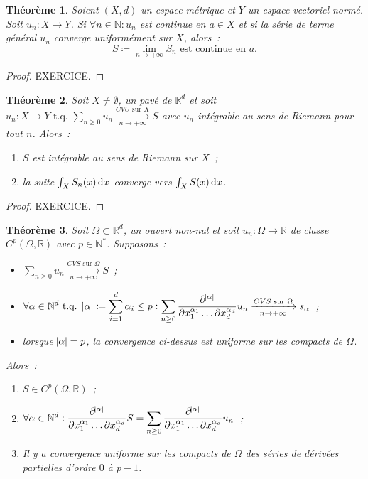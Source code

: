 \documentclass{report}
\newtheorem{thm}{Théorème}[chapter]
\theoremstyle{definition}
\theoremstyle{remark}
\numberwithin{equation}{section}
\newcommand{\R}{\mathbb R}
\newcommand{\N}{\mathbb N}
\newcommand{\tq}{\text{ t.q. }}
\newcommand{\CONV}[5]{\xrightarrow[#2 \to #3]{#4 \text{ #5 } #1}}
\newcommand{\CVS}[3]{\CONV{#1}{#2}{#3}{CVS}{sur}}
\newcommand{\CVU}[3]{\CONV{#1}{#2}{#3}{CVU}{sur}}
\newcommand{\pinfty}{{+\infty}}
\newcommand{\evn}{espace vectoriel normé}
\begin{document}
			\begin{thm}\label{thm:fncvusériecvg} Soient $(X, d)$ un espace métrique et $Y$ un \evn. Soit $u_n : X \to Y$. Si $\forall n \in \N : u_n$ est continue en
			$a \in X$ et si la série de terme général $u_n$ converge uniformément sur $X$, alors~:
			\begin{equation}
				S \coloneqq \lim_{n \to \pinfty}S_n \text{ est continue en } a.
			\end{equation}
			\end{thm}

			\begin{proof} EXERCICE.
			\end{proof}

			\begin{thm} Soit $X \neq \emptyset$, un pavé de $\R^d$ et soit $u_n : X \to Y \tq \sum_{n \geq 0}u_n \CVU Xn\pinfty S$ avec $u_n$ intégrable au
			sens de Riemann pour tout $n$. Alors~:
			\begin{enumerate}
				\item $S$ est intégrable au sens de Riemann sur $X$~;
				\item la suite $\int_XS_n(x)\dif x$ converge vers $\int_XS(x)\dif x$.
			\end{enumerate}
			\end{thm}

			\begin{proof} EXERCICE.
			\end{proof}

			\begin{thm} Soit $\Omega \subset \R^d$, un ouvert non-nul et soit $u_n : \Omega \to \R$ de classe $C^p(\Omega, \R)$ avec $p \in \N^*$.
			Supposons~:
			\begin{itemize}
				\item $\sum_{n \geq 0}u_n \CVS \Omega n\pinfty S$~;
				\item $\displaystyle \forall \alpha \in \N^d \tq \abs \alpha \coloneqq \sum_{i=1}^d\alpha_i \leq p :
					\sum_{n \geq 0}\frac {\partial^{\abs \alpha}}{\partial x_1^{\alpha_1}\ldots\partial x_d^{\alpha_d}}u_n \CVS \Omega n\pinfty s_{\alpha}$~;
				\item lorsque $\abs \alpha = p$, la convergence ci-dessus est uniforme sur les compacts de $\Omega$.
			\end{itemize}

			Alors~:
			\begin{enumerate}
				\item $S \in C^p(\Omega, \R)$~;
				\item $\displaystyle \forall \alpha \in \N^d :
					\frac {\partial^{\abs \alpha}}{\partial x_1^{\alpha_1}\ldots\partial x_d^{\alpha_d}}S =
						\sum_{n \geq 0}\frac {\partial^{\abs \alpha}}{\partial x_1^{\alpha_1}\ldots\partial x_d^{\alpha_d}}u_n$~;
				\item Il y a convergence uniforme sur les compacts de $\Omega$ des séries de dérivées partielles d'ordre $0$ à $p-1$.
			\end{enumerate}
			\end{thm}
\end{document}

